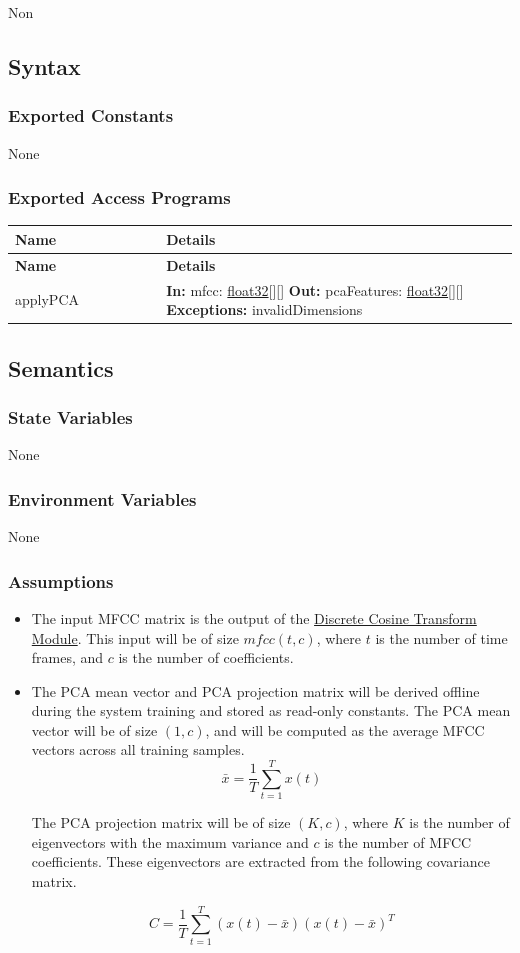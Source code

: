 \documentclass[12pt, titlepage]{article}
\newenvironment{apitable}{%
\begin{center}
\begin{longtable}{|p{0.3\linewidth}|p{0.7\linewidth}|} 
\hline
\textbf{Name} & \textbf{Details} \\
\hline
\endfirsthead
\hline
\textbf{Name} & \textbf{Details} \\
\hline
\endhead
\hline
\endfoot
\hline
\endlastfoot
}{%
\end{longtable}
\end{center}
}
\newcommand{\apifunc}[4]{%
#1 & 
\textbf{In:} #2 \newline
\textbf{Out:} #3 \newline
\textbf{Exceptions:} #4 \\
\hline
}
\begin{document}
Non

\subsection{Syntax}

\subsubsection{Exported Constants}

None

\subsubsection{Exported Access Programs}
\begin{apitable}
  \apifunc{applyPCA}
    {mfcc: \hyperref[generic:float32]{float32}[][]}
    {pcaFeatures: \hyperref[generic:float32]{float32}[][]}
    {invalidDimensions}
\end{apitable}

\subsection{Semantics}

\subsubsection{State Variables}

None

\subsubsection{Environment Variables}

None

\subsubsection{Assumptions}

\begin{itemize}
  \item The input MFCC matrix is the output of the \hyperref[MG-mDCT]{Discrete
  Cosine Transform Module}. This input will be of size $mfcc(t,c)$, where $t$ is
  the number of time frames, and $c$ is the number of coefficients. 
  \item The PCA mean vector and PCA projection matrix will be derived offline
  during the system training and stored as read-only constants. The PCA mean
  vector will be of size $(1,c)$, and will be computed as the average MFCC
  vectors across all training samples. 
    \[
    \bar{x} = \frac{1}{T} \sum_{t=1}^{T} x(t)
    \]

  The PCA projection matrix will be of size $(K, c)$, where $K$ is the number of
  eigenvectors with the maximum variance and $c$ is the number of MFCC
  coefficients. These eigenvectors are extracted from the following covariance
  matrix. 

    \[
    C = \frac{1}{T} \sum_{t=1}^{T} 
    \left(x(t) - \bar{x}\right)
    \left(x(t) - \bar{x}\right)^{T}
    \]
   
  
\end{itemize}
\end{document}
